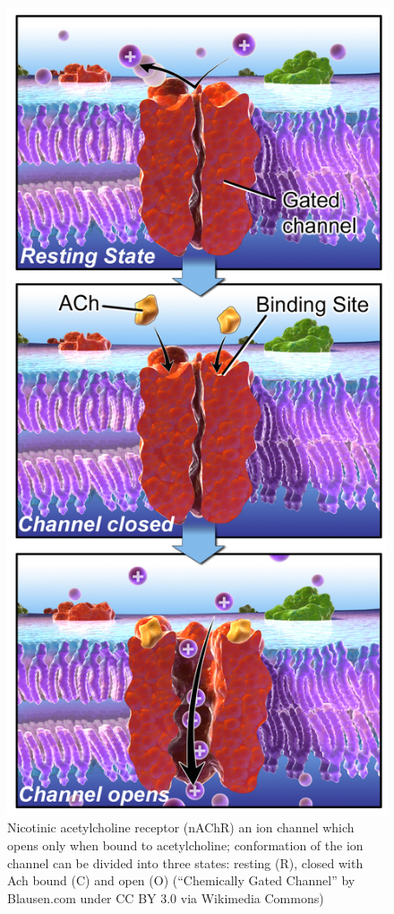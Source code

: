 \documentclass[
]{book}
\theoremstyle{definition}
\theoremstyle{definition}
\theoremstyle{definition}
\theoremstyle{remark}
\begin{document}
\begin{figure}
\centering
\includegraphics{ch10/ChemicallyGatedChannel.png}
\caption{Nicotinic acetylcholine receptor (nAChR) an ion channel which opens only when bound to acetylcholine; conformation of the ion channel can be divided into three states: resting (R), closed with Ach bound (C) and open (O) (``Chemically Gated Channel'' by Blausen.com under CC BY 3.0 via Wikimedia Commons)}
\end{figure}
\end{document}
